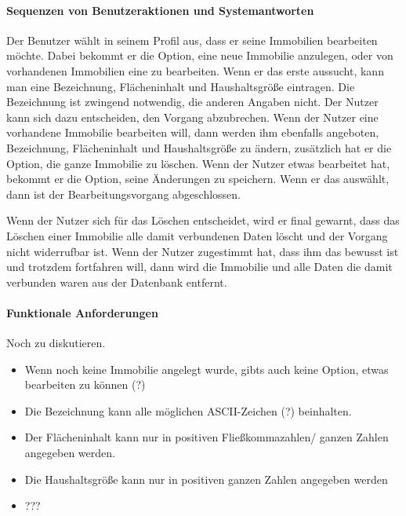 \paragraph{Sequenzen von Benutzeraktionen und Systemantworten}
Der Benutzer wählt in seinem Profil aus,
dass er seine Immobilien bearbeiten möchte.
Dabei bekommt er die Option, eine neue Immobilie anzulegen,
oder von vorhandenen Immobilien eine zu bearbeiten.
Wenn er das erste aussucht, kann man eine Bezeichnung,
Flächeninhalt und Haushaltsgröße %
eintragen. Die Bezeichnung ist zwingend notwendig, %
die anderen Angaben nicht.
Der Nutzer kann sich dazu entscheiden, den Vorgang abzubrechen.
Wenn der Nutzer eine vorhandene Immobilie bearbeiten will,
dann werden ihm ebenfalls angeboten, Bezeichnung, Flächeninhalt und
Haushaltsgröße zu ändern,
zusätzlich hat er die Option, die ganze Immobilie zu löschen.
Wenn der Nutzer etwas bearbeitet hat, bekommt er die Option, seine Änderungen zu speichern.
Wenn er das auswählt, dann ist der Bearbeitungsvorgang abgeschlossen.

Wenn der Nutzer sich für das Löschen entscheidet, wird er final gewarnt,
dass das Löschen einer Immobilie alle damit verbundenen Daten löscht und der Vorgang nicht widerrufbar ist.
Wenn der Nutzer zugestimmt hat, dass ihm das bewusst ist und trotzdem fortfahren will, dann wird die Immobilie und alle Daten die damit verbunden waren aus der Datenbank entfernt.

\paragraph{Funktionale Anforderungen}
Noch zu diskutieren.

\begin{itemize}
	\item Wenn noch keine Immobilie angelegt wurde, gibts auch keine Option, etwas bearbeiten zu können (?)
	\item Die Bezeichnung kann alle möglichen ASCII-Zeichen (?) beinhalten.
	\item Der Flächeninhalt kann nur in positiven Fließkommazahlen/ ganzen Zahlen angegeben werden.
	\item Die Haushaltsgröße kann nur in positiven ganzen Zahlen angegeben werden
	\item ???
\end{itemize}

